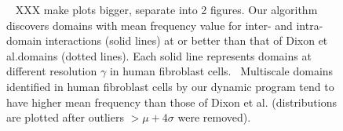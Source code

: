 \documentclass[12pt]{cmuthesis}
\begin{document}
  \begin{figure}[t]
    \begin{center}
    \caption{~ XXX make plots bigger, separate into 2 figures. Our algorithm discovers domains with mean frequency value for inter- and intra-domain interactions (solid lines) at or better than that of Dixon et al.\@ domains (dotted lines). Each solid line represents domains at different resolution $\gamma$ in human fibroblast cells. ~Multiscale domains identified in human fibroblast cells by our dynamic program tend to have higher mean frequency than those of Dixon et al.
    (distributions are plotted after outliers $> \mu+4\sigma$ were removed).}

    \label{fig:mi_jacc}
    \end{center}
  \end{figure}
\end{document}
